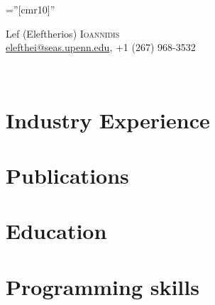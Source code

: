 \documentclass[lettersize,11pt]{article}
\begin{document}
\pagestyle{empty} %
\font\fb=''[cmr10]'' %

\par{\centering
		{\Huge Lef (Eleftherios) \textsc{Ioannidis}}\\[0.5em]
        \href{mailto:elefthei@seas.upenn.edu}{elefthei@seas.upenn.edu}, +1 (267) 968-3532 \\[0.5em]}

\begin{adjustwidth}{1cm}{1cm}
\\
\end{adjustwidth}


\section{Industry Experience}


\section{Publications}


\section{Education}


\section{Programming skills}

\end{document}
